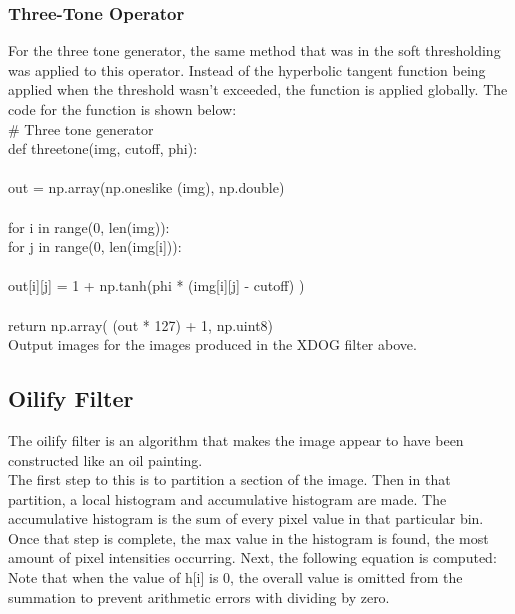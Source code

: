 \documentclass{article}
\begin{document}
	\subsubsection{Three-Tone Operator}
	
	For the three tone generator, the same method that was in the soft thresholding was applied to this operator. Instead of the hyperbolic tangent function being applied when the threshold wasn't exceeded, the function is applied globally. The code for the function is shown below:\\
	
	\noindent \# Three tone generator\\
	\noindent def three\textunderscore tone(img, cutoff, phi):\\
	\\
	\indent out = np.array(np.ones\textunderscore like (img), np.double)\\
	\\
	\indent for i in range(0, len(img)):\\
	\indent \indent for j in range(0, len(img[i])):\\
	\\
	\indent \indent \indent out[i][j] = 1 + np.tanh(phi * (img[i][j] - cutoff) )\\
	\\
	\indent return np.array( (out * 127) + 1, np.uint8)\\
	
	Output images for the images produced in the XDOG filter above.\\
	
	\subsection{Oilify Filter}
	
	The oilify filter is an algorithm that makes the image appear to have been constructed like an oil painting.\\
	
	The first step to this is to partition a section of the image. Then in that partition, a local histogram and accumulative histogram are made. The accumulative histogram is the sum of every pixel value in that particular bin. Once that step is complete, the max value in the histogram is found, the most amount of pixel intensities occurring. Next, the following equation is computed:\\
	
	Note that when the value of h[i] is 0, the overall value is omitted from the summation to prevent arithmetic errors with dividing by zero.\\
	
\end{document}
